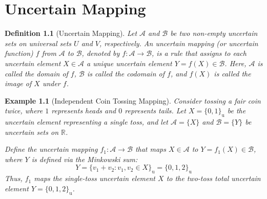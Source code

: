 \documentclass[a4paper,12pt, twoside]{memoir}
\newtheorem{definition}{Definition}[chapter]
\newtheorem{example}{Example}[chapter]
\newcommand{\tbd}[1]{\mathcal{#1}} %
\newcommand{\s}[1]{\{#1\}_\mathrm{u}} %
\begin{document}
	\chapter{Uncertain Mapping}
	\begin{definition}[Uncertain Mapping]
		Let $\tbd{A}$ and $\tbd{B}$ be two non-empty uncertain sets on universal sets $U$ and $V$, respectively. An uncertain mapping (or uncertain function) $f$ from $\tbd{A}$ to $\tbd{B}$, denoted by $f : \tbd{A} \to \tbd{B}$, is a rule that assigns to each uncertain element $X \in \tbd{A}$ a unique uncertain element $Y = f(X) \in \tbd{B}$.
		Here, $\tbd{A}$ is called the \emph{domain} of $f$, $\tbd{B}$ is called the \emph{codomain} of $f$, and $f(X)$ is called the \emph{image} of $X$ under $f$.
	\end{definition}
	
	\begin{example}[Independent Coin Tossing Mapping]
		Consider tossing a fair coin twice, where $1$ represents heads and $0$ represents tails. Let $X = \s{0, 1}$ be the uncertain element representing a single toss, and let $\tbd{A} = \{X\}$ and $\tbd{B} = \{Y\}$ be uncertain sets on $\mathbb{R}$.
		
		Define the uncertain mapping $f_1 : \tbd{A} \to \tbd{B}$ that maps $X \in \tbd{A}$ to $Y = f_1(X) \in \tbd{B}$, where $Y$ is defined via the Minkowski sum:
		\[
		Y = \s{v_1 + v_2 : v_1, v_2 \in X} = \s{0, 1, 2}
		\]
		Thus, $f_1$ maps the single-toss uncertain element $X$ to the two-toss total uncertain element $Y = \s{0, 1, 2}$.
	\end{example}
	
\end{document}
